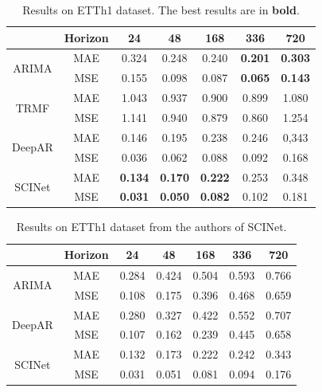 \documentclass[conference]{IEEEtran}
\begin{document}
\begin{table}[thb]
    \centering
    \begin{tabular}{cc|ccccc}
         & Horizon & 24 & 48 & 168 & 336 & 720 \\
        \hline
        \multirow{2}{*}{ARIMA} & MAE & 0.324 & 0.248 & 0.240 & \textbf{0.201} & \textbf{0.303} \\
         & MSE & 0.155 & 0.098 & 0.087 & \textbf{0.065} & \textbf{0.143} \\
        \hline
        \multirow{2}{*}{TRMF} & MAE & 1.043 & 0.937 & 0.900 & 0.899 & 1.080 \\
         & MSE & 1.141 & 0.940 & 0.879 & 0.860 & 1.254 \\
        \hline
        \multirow{2}{*}{DeepAR} & MAE & 0.146 & 0.195 & 0.238 & 0.246 & 0,343 \\
         & MSE & 0.036 & 0.062 & 0.088 & 0.092 & 0.168 \\
        \hline
        \multirow{2}{*}{SCINet} & MAE & \textbf{0.134} & \textbf{0.170} & \textbf{0.222} & 0.253 & 0.348 \\
         & MSE & \textbf{0.031} & \textbf{0.050} & \textbf{0.082} & 0.102 & 0.181 \\
    \end{tabular}
    \caption{Results on ETTh1 dataset. The best results are in \textbf{bold}.}
    \label{tab:ett_exp}
\end{table}

\begin{table}[thb]
    \centering
    \begin{tabular}{cc|ccccc}
         & Horizon & 24 & 48 & 168 & 336 & 720 \\
        \hline
        \multirow{2}{*}{ARIMA} & MAE & 0.284 & 0.424 & 0.504 & 0.593 & 0.766 \\
         & MSE & 0.108 & 0.175 & 0.396 & 0.468 & 0.659 \\
        \hline
        \multirow{2}{*}{DeepAR} & MAE & 0.280 & 0.327 & 0.422 & 0.552 & 0.707 \\
         & MSE & 0.107 & 0.162 & 0.239 & 0.445 & 0.658 \\
        \hline
        \multirow{2}{*}{SCINet} & MAE & 0.132 & 0.173 & 0.222 & 0.242 & 0.343 \\
         & MSE & 0.031 & 0.051 & 0.081 & 0.094 & 0.176 \\
    \end{tabular}
    \caption{Results on ETTh1 dataset from the authors of SCINet.}
    \label{tab:ett_scinet}
\end{table}
\end{document}
